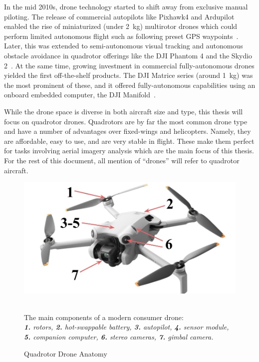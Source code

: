In the mid 2010s, drone technology started to shift away from exclusive manual piloting. The release of commercial autopilots like Pixhawk4 and Ardupilot enabled the rise of miniaturized (under 2~kg) multirotor drones which could perform limited autonomous flight such as following preset GPS waypoints~\cite{Pixhawk,Ardupilot}. Later, this was extended to semi-autonomous visual tracking and autonomous obstacle avoidance in quadrotor offerings like the DJI Phantom 4 and the Skydio 2~\cite{DJIPhantom4,Skydio2}. At the same time, growing investment in commercial fully-autonomous drones yielded the first off-the-shelf products. The DJI Matrice series (around 1~kg) was the most prominent of these, and it offered fully-autonomous capabilities using an onboard embedded computer, the DJI Manifold~\cite{DJIMatrice}.

While the drone space is diverse in both aircraft size and type, this thesis will focus on quadrotor drones. Quadrotors are by far the most common drone type and have a number of advantages over fixed-wings and helicopters. Namely, they are affordable, easy to use, and are very stable in flight. These make them perfect for tasks involving aerial imagery analysis which are the main focus of this thesis. For the rest of this document, all mention of ``drones'' will refer to quadrotor aircraft.

\begin{figure}
    \centering
    \includegraphics[width=0.75\linewidth]{chapter2/FIGS/anatomy.png}
    \begin{captext}
    \small \\ The main components of a modern consumer drone: \\\textit{\textbf{1.} rotors, \textbf{2.} hot-swappable battery, \textbf{3.} autopilot, \textbf{4.} sensor module, \\ \textbf{5.} companion computer, \textbf{6.} stereo cameras, \textbf{7.} gimbal camera.}
    \end{captext}
    \caption{Quadrotor Drone Anatomy}
    \label{fig:drone-anatomy}
\end{figure}

